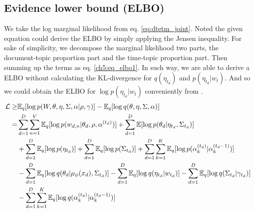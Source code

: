 \subsection{Evidence lower bound (ELBO)}
We take the log marginal likelihood from eq. \ref{eq:dtetm_joint}. Noted the given equation could derive the ELBO by simply applying the Jensen inequality. For sake of simplicity, we decompose the marginal likelihood two parts, the document-topic proportion part and the time-topic proportion part. Then summing up the terms as eq. \ref{ch5:eq_elbo1}. In such way, we are able to derive a ELBO without calculating the KL-divergence for $ q(\eta_{t_d}) $ and $ p(\eta_{t_d}|w_t) $. And so we could obtain the ELBO for $ \log p(\eta_{t_d}|w_t) $ conveniently from \cite{titsias_bayesian_nodate}.
\begin{align}\label{ch5:eq_elbo1}
\mathcal{L}\geq&\mathbb{E}_q[\log p(W,\theta,\eta,\Sigma,\alpha|\rho,\gamma)]-\mathbb{E}_q[\log q(\theta,\eta,\Sigma,\alpha)]\notag\\
=&\sum_{d=1}^{D}\sum_{n=1}^{V}\mathbb{E}_q[\log p(w_{d,n}|\theta_d,\rho,\alpha^{(t_d)})]+\sum_{d=1}^{D}\mathbb{E}[\log p(\theta_d|\eta_{t_d},\Sigma_{t_d})]\notag\\
&+\sum_{d=1}^{D}\mathbb{E}_{q}[\log p(\eta_{t_d})]+\sum_{d=1}^{D}\mathbb{E}_q[\log p(\Sigma_{t_d})]+\sum_{d=1}^{D}\sum_{k=1}^{K}\mathbb{E}_{q}[\log p(\alpha_{k}^{(t_d)}|\alpha_{k}^{(t_d-1)})]\notag\\
&-\sum_{d=1}^{D}\mathbb{E}_q[\log q(\theta_d|\mu_{\phi}(x_d),\Sigma_{t_d})]-\sum_{d=1}^{D}\mathbb{E}_{q}[\log q(\eta_{t_d}|w_{t_d})]-\sum_{d=1}^{D}\mathbb{E}_q[\log q(\Sigma_{t_d}|\gamma_{t_d})]\notag\\
&-\sum_{d=1}^{D}\sum_{k=1}^{K}\mathbb{E}_q[\log q(\alpha_{k}^{(t_d)}|\alpha_{k}^{(t_d-1)})]
\end{align}
